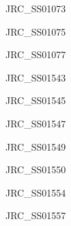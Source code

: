 \documentclass[17pt]{extarticle}
\begin{document}
\newpage\vspace*{-0.15cm}
\begin{large}
JRC\_SS01073 \\[0.5em]
\end{large}

\newpage\vspace*{-0.15cm}
\begin{large}
JRC\_SS01075 \\[0.5em]
\end{large}

\newpage\vspace*{-0.15cm}
\begin{large}
JRC\_SS01077 \\[0.5em]
\end{large}

\newpage\vspace*{-0.15cm}
\begin{large}
JRC\_SS01543 \\[0.5em]
\end{large}

\newpage\vspace*{-0.15cm}
\begin{large}
JRC\_SS01545 \\[0.5em]
\end{large}

\newpage\vspace*{-0.15cm}
\begin{large}
JRC\_SS01547 \\[0.5em]
\end{large}

\newpage\vspace*{-0.15cm}
\begin{large}
JRC\_SS01549 \\[0.5em]
\end{large}

\newpage\vspace*{-0.15cm}
\begin{large}
JRC\_SS01550 \\[0.5em]
\end{large}

\newpage\vspace*{-0.15cm}
\begin{large}
JRC\_SS01554 \\[0.5em]
\end{large}

\newpage\vspace*{-0.15cm}
\begin{large}
JRC\_SS01557 \\[0.5em]
\end{large}
\end{document}
